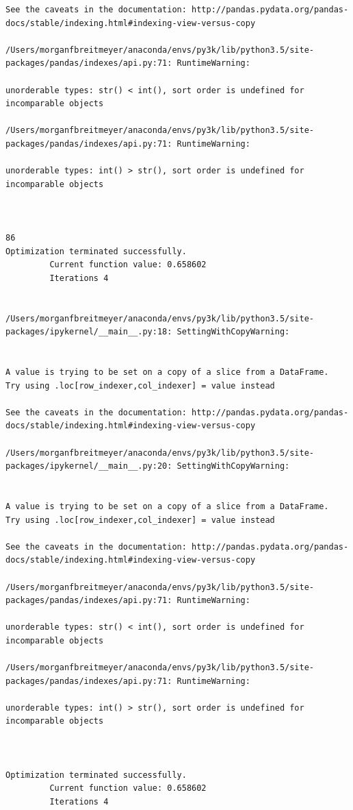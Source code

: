 \begin{lstlisting}
See the caveats in the documentation: http://pandas.pydata.org/pandas-docs/stable/indexing.html#indexing-view-versus-copy

/Users/morganfbreitmeyer/anaconda/envs/py3k/lib/python3.5/site-packages/pandas/indexes/api.py:71: RuntimeWarning:

unorderable types: str() < int(), sort order is undefined for incomparable objects

/Users/morganfbreitmeyer/anaconda/envs/py3k/lib/python3.5/site-packages/pandas/indexes/api.py:71: RuntimeWarning:

unorderable types: int() > str(), sort order is undefined for incomparable objects



86
Optimization terminated successfully.
         Current function value: 0.658602
         Iterations 4


/Users/morganfbreitmeyer/anaconda/envs/py3k/lib/python3.5/site-packages/ipykernel/__main__.py:18: SettingWithCopyWarning:


A value is trying to be set on a copy of a slice from a DataFrame.
Try using .loc[row_indexer,col_indexer] = value instead

See the caveats in the documentation: http://pandas.pydata.org/pandas-docs/stable/indexing.html#indexing-view-versus-copy

/Users/morganfbreitmeyer/anaconda/envs/py3k/lib/python3.5/site-packages/ipykernel/__main__.py:20: SettingWithCopyWarning:


A value is trying to be set on a copy of a slice from a DataFrame.
Try using .loc[row_indexer,col_indexer] = value instead

See the caveats in the documentation: http://pandas.pydata.org/pandas-docs/stable/indexing.html#indexing-view-versus-copy

/Users/morganfbreitmeyer/anaconda/envs/py3k/lib/python3.5/site-packages/pandas/indexes/api.py:71: RuntimeWarning:

unorderable types: str() < int(), sort order is undefined for incomparable objects

/Users/morganfbreitmeyer/anaconda/envs/py3k/lib/python3.5/site-packages/pandas/indexes/api.py:71: RuntimeWarning:

unorderable types: int() > str(), sort order is undefined for incomparable objects



Optimization terminated successfully.
         Current function value: 0.658602
         Iterations 4



\end{lstlisting}
